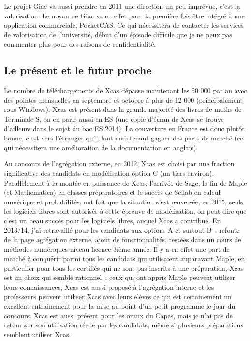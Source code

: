 \documentclass[a4paper,11pt]{article}
\begin{document}
Le projet Giac va aussi prendre en 2011 une direction un peu
impr\'evue, c'est la valorisation. Le noyau de Giac va
en effet pour la premi\`ere fois \^etre int\'egr\'e
\`a une application commerciale, PocketCAS. Ce qui n\'ecessitera
de contacter les services de valorisation de l'universit\'e, d\'ebut d'un \'episode
difficile que je ne peux pas commenter plus pour des
raisons de confidentialit\'e.

\subsection{Le pr\'esent et le futur proche}
Le nombre de t\'el\'echargements de Xcas d\'epasse maintenant
les 50 000 par an avec des pointes mensuelles en septembre et octobre
\`a plus de 12 000 (principalement sous Windows). Xcas est
pr\'esent dans la grande majorit\'e des livres de maths de Terminale
S, on en parle aussi en ES (une copie d'\'ecran de Xcas se trouve
d'ailleurs dans le sujet du bac ES 2014).
La couverture en France est donc plut\^ot bonne, c'est
vers l'\'etranger qu'il faut maintenant gagner des parts de march\'e
(ce qui n\'ecessitera une am\'elioration de la documentation
en anglais).

Au concours de l'agr\'egation externe,
en 2012, Xcas est choisi par une fraction
significative des candidats en mod\'elisation option C
(un tiers environ).
Parall\`element \`a la mont\'ee en
puissance de Xcas, l'arriv\'ee de Sage, la fin de Maple (et
Mathematica) en classes pr\'eparatoires
et le succ\`es de Scilab en calcul num\'erique et probabilit\'es, ont
fait que la situation s'est renvers\'ee, en 2015,
seuls les logiciels libres sont autoris\'es
\`a cette \'epreuve de mod\'elisation, on peut
dire que c'est un beau succ\`es pour les logiciels libres,
auquel Xcas a contribu\'e.
En 2013/14, j'ai retravaill\'e pour les candidats
aux options A et surtout B~: refonte de
la page agr\'egation externe, ajout de fonctionnalit\'es,
test\'ees dans un cours de m\'ethodes num\'eriques
niveau licence 3i\`eme ann\'ee. Il y a en effet une part de march\'e
\`a conqu\'erir parmi tous les candidats qui utilisaient auparavant
Maple, en particulier pour tous les certifi\'es qui
ne sont pas inscrits \`a une pr\'eparation, Xcas est un choix
qui semble rationnel~: ceux qui ont appris Maple peuvent
utiliser leurs connaissances, Xcas est aussi propos\'e
\`a l'agr\'egation interne et les professeurs peuvent utiliser Xcas avec
leurs \'el\`eves ce qui est certainement un excellent entrainement
pour la mise au point d'un petit programme le jour du concours.
Xcas est aussi pr\'esent pour les oraux du Capes, mais je n'ai
pas de retour sur son utilisation r\'eelle par les candidats,
m\^eme si plusieurs pr\'eparations semblent utiliser Xcas.
\end{document}
